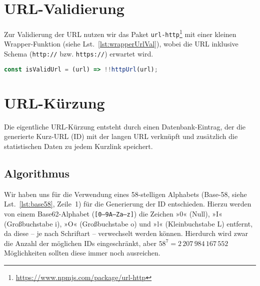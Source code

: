 \documentclass[a4paper,11pt,DIV=12,overfullrule=on]{scrreprt}%
\begin{document}
\section{URL-Validierung}
Zur Validierung der URL nutzen wir das Paket \texttt{url-http}\footnote{\href{https://www.npmjs.com/package/url-http}{https://www.npmjs.com/package/url-http}} mit einer kleinen Wrapper-Funktion (siehe Lst.~\ref{lst:wrapperUrlVal}), wobei die \ac{URL} inklusive Schema (\texttt{http://} bzw. \texttt{https://}) erwartet wird.

\begin{lstlisting}[language=JavaScript,
    caption={Wrapper-Funktion zur URL-Validierung},
    label={lst:wrapperUrlVal},
    float=h,
    gobble=4
]
    const isValidUrl = (url) => !!httpUrl(url);
\end{lstlisting}


\section{URL-Kürzung}
Die eigentliche URL-Kürzung entsteht durch einen Datenbank-Eintrag, der die generierte Kurz-\ac{URL} (ID) mit der langen \ac{URL} verknüpft und zusätzlich die statistischen Daten zu jedem Kurzlink speichert.
\subsection{Algorithmus}
Wir haben uns für die Verwendung eines 58-stelligen Alphabets (Base-58\label{sec:base58}, siehe Lst.~\ref{lst:base58}, Zeile~1) für die Generierung der ID entschieden. Hierzu werden von einem Base62-Alphabet (\texttt{[0–9A–Za–z]}) die Zeichen »0« (Null), »I« (Großbuchstabe i), »O« (Großbuchstabe o) und »l« (Kleinbuchstabe L) entfernt, da diese – je nach Schriftart – verwechselt werden können. Hierdurch wird zwar die Anzahl der möglichen IDs eingeschränkt, aber $58^7 =  2\,207\,984\,167\,552$ Möglichkeiten sollten diese immer noch ausreichen.
\end{document}
